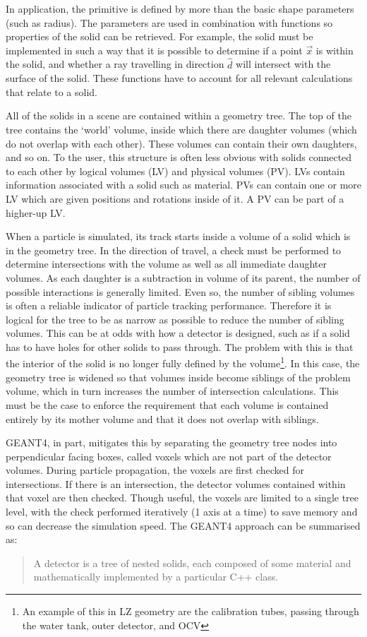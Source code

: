 \par
In application, the primitive is defined by more than the basic shape parameters (such as radius).
The parameters are used in combination with functions so properties of the solid can be retrieved.
For example, the solid must be implemented in such a way that it is possible to determine if a point $\vec{x}$ is within the solid, and whether a ray travelling in direction $\hat{d}$ will intersect with the surface of the solid.
These functions have to account for all relevant calculations that relate to a solid.
\par
All of the solids in a scene are contained within a geometry tree.
The top of the tree contains the `world' volume, inside which there are daughter volumes (which do not overlap with each other).
These volumes can contain their own daughters, and so on.
To the user, this structure is often less obvious with solids connected to each other by logical volumes (LV) and physical volumes (PV).
LVs contain information associated with a solid such as material. 
PVs can contain one or more LV which are given positions and rotations inside of it. 
A PV can be part of a higher-up LV.
\par
When a particle is simulated, its track starts inside a volume of a solid which is in the geometry tree.
In the direction of travel, a check must be performed to determine intersections with the volume as well as all immediate daughter volumes.
As each daughter is a subtraction in volume of its parent, the number of possible interactions is generally limited.
Even so, the number of sibling volumes is often a reliable indicator of particle tracking performance.
Therefore it is logical for the tree to be as narrow as possible to reduce the number of sibling volumes.
This can be at odds with how a detector is designed, such as if a solid has to have holes for other solids to pass through.
The problem with this is that the interior of the solid is no longer fully defined by the volume\footnote{An example of this in LZ geometry are the calibration tubes, passing through the water tank, outer detector, and OCV}.
In this case, the geometry tree is widened so that volumes inside become siblings of the problem volume, which in turn increases the number of intersection calculations.
This must be the case to enforce the requirement that each volume is contained entirely by its mother volume and that it does not overlap with siblings.
\par
GEANT4, in part, mitigates this by separating the geometry tree nodes into perpendicular facing boxes, called voxels \cite{geant4_voxel_ref} which are not part of the detector volumes.
During particle propagation, the voxels are first checked for intersections.
If there is an intersection, the detector volumes contained within that voxel are then checked.
Though useful, the voxels are limited to a single tree level, with the check performed iteratively (1 axis at a time) to save memory and so can decrease the simulation speed.
The GEANT4 approach can be summarised as:
\begin{quote}
    A detector is a tree of nested solids, each composed of some material and mathematically implemented by a particular C++ class.
\end{quote}

